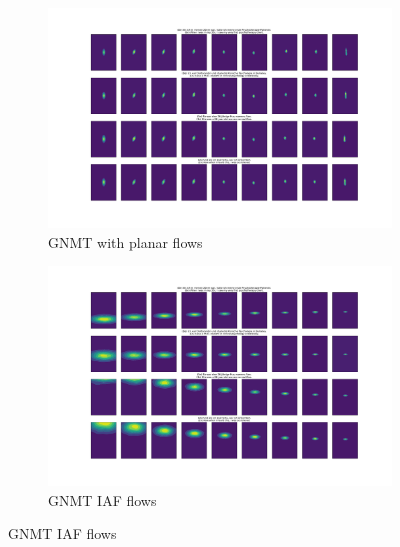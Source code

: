 \begin{figure}
	\centering
	\begin{subfigure}[b]{\textwidth}
		\centering
		\includegraphics[width=\textwidth]{vaenmt_planar_flows_plot.pdf}
		\caption{\ac{GNMT} with planar flows}
		\label{fig:gnmt_planar}
	\end{subfigure}
	\hfill
	\begin{subfigure}[b]{\textwidth}
		\centering
		\includegraphics[width=\textwidth]{vaenmt_iaf_flows_plot.pdf}
		\caption{\ac{GNMT} \ac{IAF} flows}
		\label{fig:gnmt_iaf}
	\end{subfigure}
\end{figure}

